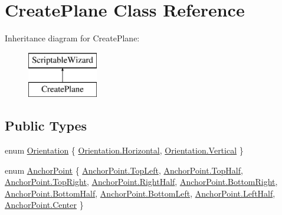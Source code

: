 \hypertarget{class_create_plane}{}\section{Create\+Plane Class Reference}
\label{class_create_plane}
Inheritance diagram for Create\+Plane\+:\begin{figure}[H]
\begin{center}
\leavevmode
\includegraphics[height=2.000000cm]{class_create_plane}
\end{center}
\end{figure}
\subsection*{Public Types}
\begin{DoxyCompactItemize}
\item 
enum \mbox{\hyperlink{class_create_plane_a7db5f8e98159fe90f49c5ede4e04a3d2}{Orientation}} \{ \mbox{\hyperlink{class_create_plane_a7db5f8e98159fe90f49c5ede4e04a3d2ac1b5fa03ecdb95d4a45dd1c40b02527f}{Orientation.\+Horizontal}}, 
\mbox{\hyperlink{class_create_plane_a7db5f8e98159fe90f49c5ede4e04a3d2a06ce2a25e5d12c166a36f654dbea6012}{Orientation.\+Vertical}}
 \}
\item 
enum \mbox{\hyperlink{class_create_plane_a9355b690af33c2b449c1ce539006ecfc}{Anchor\+Point}} \{ \newline
\mbox{\hyperlink{class_create_plane_a9355b690af33c2b449c1ce539006ecfcab32beb056fbfe36afbabc6c88c81ab36}{Anchor\+Point.\+Top\+Left}}, 
\mbox{\hyperlink{class_create_plane_a9355b690af33c2b449c1ce539006ecfca51f9ab089e0b40e3f7aa46e5291f30cb}{Anchor\+Point.\+Top\+Half}}, 
\mbox{\hyperlink{class_create_plane_a9355b690af33c2b449c1ce539006ecfca1d85a557894c340c318493f33bfa8efb}{Anchor\+Point.\+Top\+Right}}, 
\mbox{\hyperlink{class_create_plane_a9355b690af33c2b449c1ce539006ecfca5c21466e6a11e3b4d62d7de3c266fb48}{Anchor\+Point.\+Right\+Half}}, 
\newline
\mbox{\hyperlink{class_create_plane_a9355b690af33c2b449c1ce539006ecfca9146bfc669fddc88db2c4d89297d0e9a}{Anchor\+Point.\+Bottom\+Right}}, 
\mbox{\hyperlink{class_create_plane_a9355b690af33c2b449c1ce539006ecfcad4621240e4feb9c1a91350cdfebad59d}{Anchor\+Point.\+Bottom\+Half}}, 
\mbox{\hyperlink{class_create_plane_a9355b690af33c2b449c1ce539006ecfca98e5a1c44509157ebcaf46c515c78875}{Anchor\+Point.\+Bottom\+Left}}, 
\mbox{\hyperlink{class_create_plane_a9355b690af33c2b449c1ce539006ecfcaf315be6dba342fe1d687e4a74f3a1e1a}{Anchor\+Point.\+Left\+Half}}, 
\newline
\mbox{\hyperlink{class_create_plane_a9355b690af33c2b449c1ce539006ecfca4f1f6016fc9f3f2353c0cc7c67b292bd}{Anchor\+Point.\+Center}}
 \}
\end{DoxyCompactItemize}
